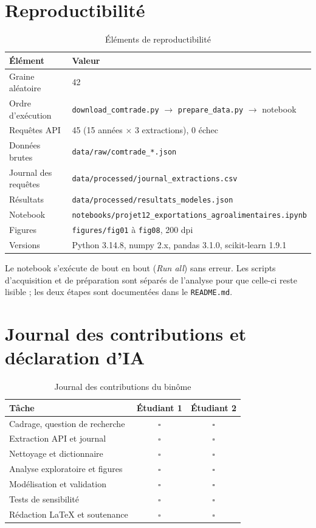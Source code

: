 \documentclass[11pt,a4paper]{article}
\begin{document}
\appendix
\section{Reproductibilité}\label{ann:repro}

\begin{table}[H]
\centering
\caption{Éléments de reproductibilité}\label{tab:repro}
\begin{tabular}{ll}
\toprule
Élément & Valeur \\
\midrule
Graine aléatoire & 42 \\
Ordre d'exécution & \texttt{download\_comtrade.py} $\to$ \texttt{prepare\_data.py} $\to$ notebook \\
Requêtes API & 45 (15 années $\times$ 3 extractions), 0 échec \\
Données brutes & \texttt{data/raw/comtrade\_*.json} \\
Journal des requêtes & \texttt{data/processed/journal\_extractions.csv} \\
Résultats & \texttt{data/processed/resultats\_modeles.json} \\
Notebook & \texttt{notebooks/projet12\_exportations\_agroalimentaires.ipynb} \\
Figures & \texttt{figures/fig01} à \texttt{fig08}, 200 dpi \\
Versions & Python 3.14.8, numpy 2.x, pandas 3.1.0, scikit-learn 1.9.1 \\
\bottomrule
\end{tabular}
\end{table}

Le notebook s'exécute de bout en bout (\emph{Run all}) sans erreur. Les scripts
d'acquisition et de préparation sont séparés de l'analyse pour que celle-ci
reste lisible ; les deux étapes sont documentées dans le \texttt{README.md}.

\section{Journal des contributions et déclaration d'IA}

\begin{table}[H]
\centering
\caption{Journal des contributions du binôme}\label{tab:contrib}
\begin{tabular}{lcc}
\toprule
Tâche & Étudiant 1 & Étudiant 2 \\
\midrule
Cadrage, question de recherche & $\square$ & $\square$ \\
Extraction API et journal & $\square$ & $\square$ \\
Nettoyage et dictionnaire & $\square$ & $\square$ \\
Analyse exploratoire et figures & $\square$ & $\square$ \\
Modélisation et validation & $\square$ & $\square$ \\
Tests de sensibilité & $\square$ & $\square$ \\
Rédaction \LaTeX{} et soutenance & $\square$ & $\square$ \\
\bottomrule
\end{tabular}
\end{table}
\end{document}
